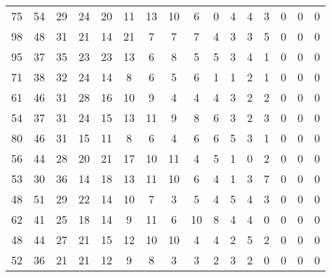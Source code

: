 \begin{tabular}{S S S S S S S S S S S S S S S S}
        75 & 54 & 29 & 24 & 20 & 11 & 13 & 10 &  6 &  0 &  4 &  4 &  3 &  0 &  0 &  0 \\
        98 & 48 & 31 & 21 & 14 & 21 &  7 &  7 &  7 &  4 &  3 &  3 &  5 &  0 &  0 &  0 \\
        95 & 37 & 35 & 23 & 23 & 13 &  6 &  8 &  5 &  5 &  3 &  4 &  1 &  0 &  0 &  0 \\
        71 & 38 & 32 & 24 & 14 &  8 &  6 &  5 &  6 &  1 &  1 &  2 &  1 &  0 &  0 &  0 \\
        61 & 46 & 31 & 28 & 16 & 10 &  9 &  4 &  4 &  4 &  3 &  2 &  2 &  0 &  0 &  0 \\
        54 & 37 & 31 & 24 & 15 & 13 & 11 &  9 &  8 &  6 &  3 &  2 &  3 &  0 &  0 &  0 \\
        80 & 46 & 31 & 15 & 11 &  8 &  6 &  4 &  6 &  6 &  5 &  3 &  1 &  0 &  0 &  0 \\
        56 & 44 & 28 & 20 & 21 & 17 & 10 & 11 &  4 &  5 &  1 &  0 &  2 &  0 &  0 &  0 \\
        53 & 30 & 36 & 14 & 18 & 13 & 11 & 10 &  6 &  4 &  1 &  3 &  7 &  0 &  0 &  0 \\
        48 & 51 & 29 & 22 & 14 & 10 &  7 &  3 &  5 &  4 &  5 &  4 &  3 &  0 &  0 &  0 \\
        62 & 41 & 25 & 18 & 14 &  9 & 11 &  6 & 10 &  8 &  4 &  4 &  0 &  0 &  0 &  0 \\
        48 & 44 & 27 & 21 & 15 & 12 & 10 & 10 &  4 &  4 &  2 &  5 &  2 &  0 &  0 &  0 \\
        52 & 36 & 21 & 21 & 12 &  9 &  8 &  3 &  3 &  2 &  3 &  2 &  0 &  0 &  0 &  0 \\
        \bottomrule
    \end{tabular}
